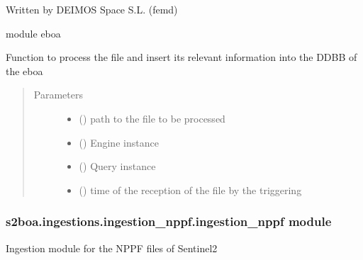 Written by DEIMOS Space S.L. (femd)

module eboa

\begin{fulllineitems}
\label{\detokenize{s2boa.ingestions:s2boa.ingestions.ingestion_ltas.ingestion_ltas.process_file}}
Function to process the file and insert its relevant information
into the DDBB of the eboa
\begin{quote}\begin{description}
\item[{Parameters}] \leavevmode\begin{itemize}
\item {} 
 () \textendash{} path to the file to be processed

\item {} 
 () \textendash{} Engine instance

\item {} 
 () \textendash{} Query instance

\item {} 
 () \textendash{} time of the reception of the file by the triggering

\end{itemize}

\end{description}\end{quote}

\end{fulllineitems}



\subsubsection{s2boa.ingestions.ingestion\_nppf.ingestion\_nppf module}
\label{\detokenize{s2boa.ingestions:module-s2boa.ingestions.ingestion_nppf.ingestion_nppf}}\label{\detokenize{s2boa.ingestions:s2boa-ingestions-ingestion-nppf-ingestion-nppf-module}}
Ingestion module for the NPPF files of Sentinel\sphinxhyphen{}2

